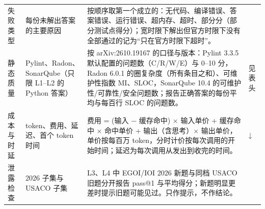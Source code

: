 {\begin{longtable}{@{}p{1.6cm}p{2.6cm}p{10.3cm}p{0.9cm}@{}}
失败类型 & 每份未解出答案的主要原因 & 按顺序取第一个成立的：无代码、编译错误、答案错误、运行错误、超内存、超时、部分分（部分测试点得分）；宽时限下解出但官方时限下没有全部通过的记为“只在官方时限下超时”。 &  \\
静态质量 & Pylint、Radon、SonarQube（只限 L1–L2 的 Python 答案） & 按 arXiv:2610.19167 的口径与版本：Pylint 3.3.5 默认配置的问题数（C/R/W/E）与 0–10 分，Radon 6.0.1 的圈复杂度（所有条目之和）、可维护性指数 MI、SLOC，SonarQube 10.4 的可维护性/可靠性/安全问题数；报告正确答案的每份平均与每百行 SLOC 的问题数。 & 见表头 \\
成本与时延 & token、费用、延迟、首个 token 时间 & 费用 = (输入 − 缓存命中) × 输入单价 + 缓存命中 × 命中单价 + 输出（含思考）× 输出单价，单价按每百万 token，分时计价按每次调用的开始时间；延迟为每次调用从发出到收完的时间。 & ↓ \\
泄露检查 & 2026 子集与 USACO 子集 & L3、L4 中 EGOI/IOI 2026 新题与同档 USACO 旧题分开报告 pass@1 与平均得分；新题明显更差时提示旧题可能见过。只作提示，不作结论。 &  \\
\bottomrule
\end{longtable}}
